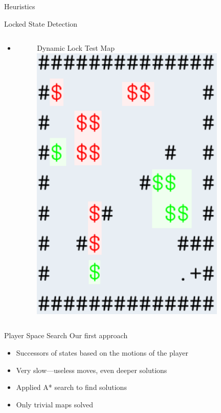 \documentclass{beamer}
\begin{document}
\begin{frame}{Heuristics}
  
\end{frame}

\begin{frame}{Locked State Detection}
  \begin{columns}
    \begin{column}{.5\textwidth}
      \begin{itemize}
        \item
      \end{itemize}
    \end{column}
    \begin{column}{.5\textwidth}
      \begin{block}{Dynamic Lock Test Map}
        \centering
        \includegraphics[width=0.8\textwidth]{dynamic.png}
      \end{block}
    \end{column}
  \end{columns}

\end{frame}

\begin{frame}{Player Space Search}
  Our first approach
  \begin{itemize}
  \item Successors of states based on the motions of the player
  \item Very slow---useless moves, even deeper solutions
  \item Applied A* search to find solutions
  \item Only trivial maps solved
  \end{itemize}
\end{frame}
\end{document}
